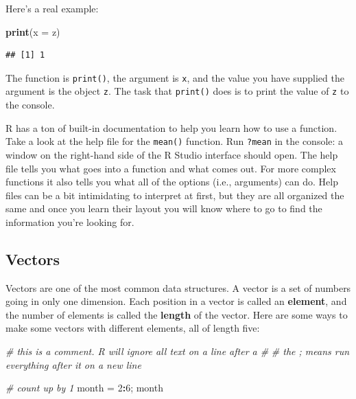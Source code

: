\documentclass[]{book}
\newenvironment{Shaded}{\begin{snugshade}}{\end{snugshade}}
\newcommand{\CommentTok}[1]{\textcolor[rgb]{0.56,0.35,0.01}{\textit{#1}}}
\newcommand{\DataTypeTok}[1]{\textcolor[rgb]{0.13,0.29,0.53}{#1}}
\newcommand{\DecValTok}[1]{\textcolor[rgb]{0.00,0.00,0.81}{#1}}
\newcommand{\KeywordTok}[1]{\textcolor[rgb]{0.13,0.29,0.53}{\textbf{#1}}}
\newcommand{\NormalTok}[1]{#1}
\newcommand{\OperatorTok}[1]{\textcolor[rgb]{0.81,0.36,0.00}{\textbf{#1}}}
\newcommand{\StringTok}[1]{\textcolor[rgb]{0.31,0.60,0.02}{#1}}
\begin{document}
Here's a real example:

\begin{Shaded}
\begin{Highlighting}[]
\KeywordTok{print}\NormalTok{(}\DataTypeTok{x =}\NormalTok{ z)}
\end{Highlighting}
\end{Shaded}

\begin{verbatim}
## [1] 1
\end{verbatim}

The function is \texttt{print()}, the argument is \texttt{x}, and the value you have supplied the argument is the object \texttt{z}. The task that \texttt{print()} does is to print the value of \texttt{z} to the console.

R has a ton of built-in documentation to help you learn how to use a function. Take a look at the help file for the \texttt{mean()} function. Run \texttt{?mean} in the console: a window on the right-hand side of the R Studio interface should open. The help file tells you what goes into a function and what comes out. For more complex functions it also tells you what all of the options (i.e., arguments) can do. Help files can be a bit intimidating to interpret at first, but they are all organized the same and once you learn their layout you will know where to go to find the information you're looking for.

\hypertarget{vectors}{%
\subsection{Vectors}\label{vectors}}

Vectors are one of the most common data structures. A vector is a set of numbers going in only one dimension. Each position in a vector is called an \textbf{element}, and the number of elements is called the \textbf{length} of the vector. Here are some ways to make some vectors with different elements, all of length five:

\begin{Shaded}
\begin{Highlighting}[]
\CommentTok{# this is a comment. R will ignore all text on a line after a #}
\CommentTok{# the ; means run everything after it on a new line}

\CommentTok{# count up by 1}
\NormalTok{month =}\StringTok{ }\DecValTok{2}\OperatorTok{:}\DecValTok{6}\NormalTok{; month}
\end{Highlighting}
\end{Shaded}
\end{document}
